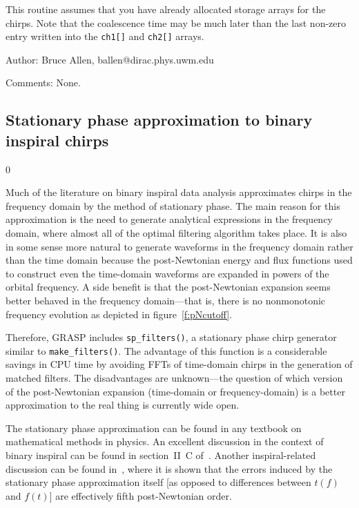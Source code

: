 This routine assumes that you have already allocated storage arrays for
the chirps. Note that the coalescence time may be much later than the last
non-zero entry written into the {\tt ch1[]} and {\tt ch2[]} arrays.
\begin{description}
\item{Author:}
Bruce Allen, ballen@dirac.phys.uwm.edu
\item{Comments:}
None.
\end{description}
\clearpage


\subsection{Stationary phase approximation to binary inspiral chirps}
\label{ss:statphase}
\setcounter{equation}0

Much of the literature on binary inspiral data analysis approximates
chirps in the frequency domain by the method of stationary phase.  The
main reason for this approximation is the need to generate analytical
expressions in the frequency domain, where almost all of the optimal
filtering algorithm takes place.  It is also in some sense more
natural to generate waveforms in the frequency domain rather than the
time domain because the post-Newtonian energy and flux functions used
to construct even the time-domain waveforms are expanded in powers of
the orbital frequency.  A side benefit is that the post-Newtonian
expansion seems better behaved in the frequency domain---that is,
there is no nonmonotonic frequency evolution as depicted in
figure~\ref{f:pNcutoff}.

Therefore, GRASP includes {\tt sp\_filters()}, a stationary phase
chirp generator similar to {\tt make\_filters()}.  The advantage of
this function is a considerable savings in CPU time by avoiding FFTs
of time-domain chirps in the generation of matched filters.  The
disadvantages are unknown---the question of which version of the
post-Newtonian expansion (time-domain or frequency-domain) is a better
approximation to the real thing is currently wide open.

The stationary phase approximation can be found in any textbook on
mathematical methods in physics.  An excellent discussion in the
context of binary inspiral can be found in section~II~C
of~\cite{cutler:1994}.  Another inspiral-related discussion can be
found in~\cite{droz:1999}, where it is shown that the errors induced
by the stationary phase approximation itself [as opposed to
differences between $t(f)$ and $f(t)$] are effectively fifth
post-Newtonian order.

